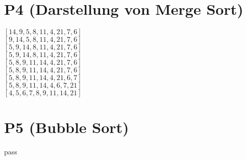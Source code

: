 \documentclass[a4paper,12pt]{article}
\begin{document}
\section{P4 (Darstellung von Merge Sort)}
\begin{center}
$[14, 9, 5, 8, 11, 4, 21, 7, 6]$\\
$[9, 14, 5, 8, 11, 4, 21, 7, 6]$\\
$[5, 9, 14, 8, 11, 4, 21, 7, 6]$\\
$[5, 9, 14, 8, 11, 4, 21, 7, 6]$\\
$[5, 8, 9, 11, 14, 4, 21, 7, 6]$\\
$[5, 8, 9, 11, 14, 4, 21, 7, 6]$\\
$[5, 8, 9, 11, 14, 4, 21, 6, 7]$\\
$[5, 8, 9, 11, 14, 4, 6, 7, 21]$\\
$[4, 5, 6, 7, 8, 9, 11, 14, 21]$\\
\end{center}

\section{P5 (Bubble Sort)}
pass
\end{document}
